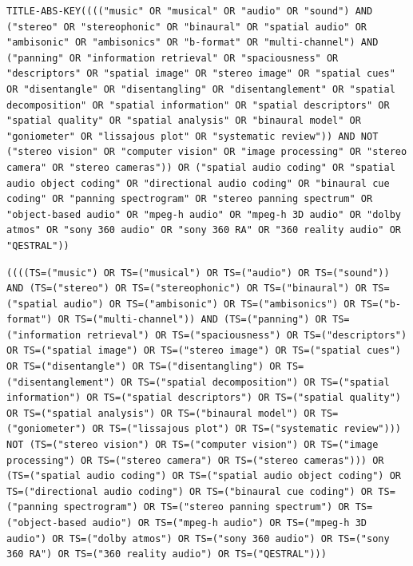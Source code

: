 \documentclass[referee,pdflatex,sn-mathphys-num]{sn-jnl}%
\begin{document}
\begin{appendices}
\noindent\begin{minipage}{\linewidth}
\begin{singlespace}
\begin{lstlisting}[caption=Scopus query]
TITLE-ABS-KEY(((("music" OR "musical" OR "audio" OR "sound") AND ("stereo" OR "stereophonic" OR "binaural" OR "spatial audio" OR "ambisonic" OR "ambisonics" OR "b-format" OR "multi-channel") AND ("panning" OR "information retrieval" OR "spaciousness" OR "descriptors" OR "spatial image" OR "stereo image" OR "spatial cues" OR "disentangle" OR "disentangling" OR "disentanglement" OR "spatial decomposition" OR "spatial information" OR "spatial descriptors" OR "spatial quality" OR "spatial analysis" OR "binaural model" OR "goniometer" OR "lissajous plot" OR "systematic review")) AND NOT ("stereo vision" OR "computer vision" OR "image processing" OR "stereo camera" OR "stereo cameras")) OR ("spatial audio coding" OR "spatial audio object coding" OR "directional audio coding" OR "binaural cue coding" OR "panning spectrogram" OR "stereo panning spectrum" OR "object-based audio" OR "mpeg-h audio" OR "mpeg-h 3D audio" OR "dolby atmos" OR "sony 360 audio" OR "sony 360 RA" OR "360 reality audio" OR "QESTRAL"))
\end{lstlisting}
\end{singlespace}
\end{minipage}

\noindent\begin{minipage}{\linewidth}
\begin{singlespace}
\begin{lstlisting}[caption=\glsxtrlong{wos} query]
((((TS=("music") OR TS=("musical") OR TS=("audio") OR TS=("sound")) AND (TS=("stereo") OR TS=("stereophonic") OR TS=("binaural") OR TS=("spatial audio") OR TS=("ambisonic") OR TS=("ambisonics") OR TS=("b-format") OR TS=("multi-channel")) AND (TS=("panning") OR TS=("information retrieval") OR TS=("spaciousness") OR TS=("descriptors") OR TS=("spatial image") OR TS=("stereo image") OR TS=("spatial cues") OR TS=("disentangle") OR TS=("disentangling") OR TS=("disentanglement") OR TS=("spatial decomposition") OR TS=("spatial information") OR TS=("spatial descriptors") OR TS=("spatial quality") OR TS=("spatial analysis") OR TS=("binaural model") OR TS=("goniometer") OR TS=("lissajous plot") OR TS=("systematic review"))) NOT (TS=("stereo vision") OR TS=("computer vision") OR TS=("image processing") OR TS=("stereo camera") OR TS=("stereo cameras"))) OR (TS=("spatial audio coding") OR TS=("spatial audio object coding") OR TS=("directional audio coding") OR TS=("binaural cue coding") OR TS=("panning spectrogram") OR TS=("stereo panning spectrum") OR TS=("object-based audio") OR TS=("mpeg-h audio") OR TS=("mpeg-h 3D audio") OR TS=("dolby atmos") OR TS=("sony 360 audio") OR TS=("sony 360 RA") OR TS=("360 reality audio") OR TS=("QESTRAL")))
\end{lstlisting}
\end{singlespace}
\end{minipage}


\end{appendices}
\end{document}
